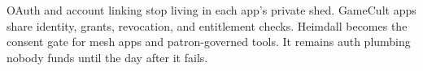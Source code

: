 \ProjectionBand
{OAuth and account linking stop living in each app's private shed.}
{GameCult apps share identity, grants, revocation, and entitlement checks.}
{Heimdall becomes the consent gate for mesh apps and patron-governed tools.}
{It remains auth plumbing nobody funds until the day after it fails.}

